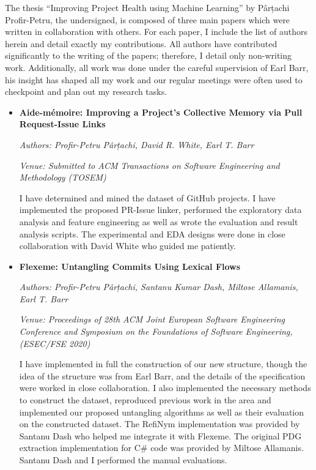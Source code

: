 \begin{conjoint}

The thesis “Improving Project Health using Machine Learning” by Pârțachi
Profir-Petru, the undersigned, is composed of three main papers which were
written in collaboration with others. For each paper, I include the list of
authors herein and detail exactly my contributions. All authors have contributed
significantly to the writing of the papers; therefore, I detail only non-writing
work. Additionally, all work was done under the careful supervision of Earl
Barr, his insight has shaped all my work and our regular meetings were often
used to checkpoint and plan out my research tasks.

\begin{itemize}[leftmargin=*]
    \item[] \textbf{Aide-mémoire: Improving a Project’s Collective Memory via
Pull Request-Issue Links} 
    
    \noindent\emph{Authors: Profir-Petru Pârțachi, David R. White, Earl T. Barr}
    
    \noindent\emph{Venue: Submitted to ACM Transactions on Software Engineering
    and Methodology (TOSEM)}

    \noindent I have determined and mined the dataset of GitHub projects. I have
    implemented the proposed PR-Issue linker, performed the exploratory data
    analysis and feature engineering as well as wrote the evaluation and result
    analysis scripts. The experimental and EDA designs were done in close
    collaboration with David White who guided me patiently.

    \item[] \noindent\textbf{Flexeme: Untangling Commits Using Lexical Flows}
    
    \noindent\emph{Authors: Profir-Petru Pârțachi, Santanu Kumar Dash, Miltose
    Allamanis, Earl T. Barr}
    
    \noindent\emph{Venue: Proceedings of 28th ACM Joint European Software
    Engineering Conference and Symposium on the Foundations of Software
    Engineering, (ESEC/FSE 2020)}

    \noindent  I have implemented in full the construction of our new structure,
    though the idea of the structure was from Earl Barr, and the details of the
    specification were worked in close collaboration. I also implemented the
    necessary methods to construct the dataset, reproduced previous work in the
    area and implemented our proposed untangling algorithms as well as their
    evaluation on the constructed dataset. The RefiNym implementation was
    provided by Santanu Dash who helped me integrate it with Flexeme. The
    original PDG extraction implementation for C\# code was provided by Miltose
    Allamanis. Santanu Dash and I performed the manual evaluations.
    

\end{itemize}
\end{conjoint}
